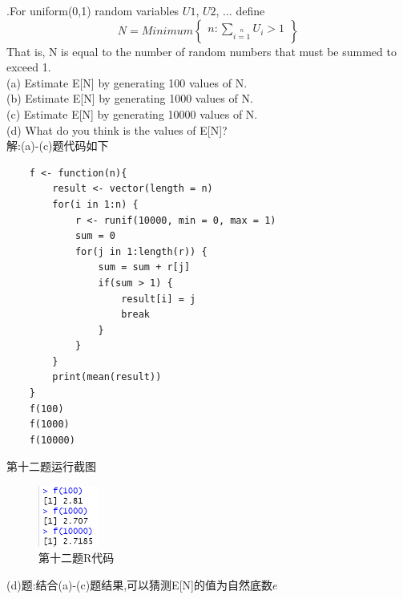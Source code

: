 \documentclass{book}
\begin{document}
.For uniform(0,1) random variables $U1$, $U2$, ... define
$$
    N = Minimum
    \left\{
    \begin{array}{l}
        n:\sum\limits_{i=1}\limits^{n} U_{i} > 1
    \end{array}
    \right\}
$$
That is, N is equal to the number of random numbers that must be summed to exceed 1. \\
(a) Estimate E[N] by generating 100 values of N. \\
(b) Estimate E[N] by generating 1000 values of N. \\
(c) Estimate E[N] by generating 10000 values of N. \\
(d) What do you think is the values of E[N]? \\
解:(a)-(c)题代码如下
\lstset{language = R}
\begin{lstlisting}
    f <- function(n){
        result <- vector(length = n)
        for(i in 1:n) {
            r <- runif(10000, min = 0, max = 1)
            sum = 0
            for(j in 1:length(r)) {
                sum = sum + r[j]
                if(sum > 1) {
                    result[i] = j
                    break
                }
            }
        }
        print(mean(result))
    }
    f(100)
    f(1000)
    f(10000)
\end{lstlisting}
第十二题运行截图
\begin{figure}[H]
    \centering
    \includegraphics*[height = 2cm, width = 2cm]{gramFile/第十二题运行截图.PNG}
    \caption{第十二题R代码}
\end{figure}
\noindent
(d)题:结合(a)-(c)题结果,可以猜测E[N]的值为自然底数$e$

\hspace*{\fill} \\
\end{document}
